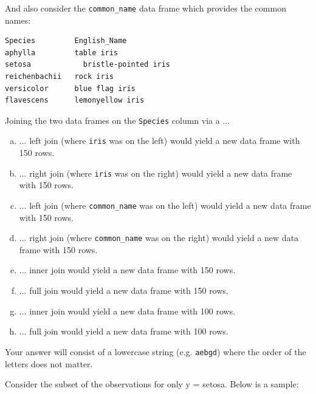 \documentclass[12pt,landscape]{article}
\newcommand{\instr}{\small Your answer will consist of a lowercase string (e.g. \texttt{aebgd}) where the order of the letters does not matter. \normalsize}
\begin{document}
\vspace{-0.7cm}

\noindent And also consider the \texttt{common\_name} data frame which provides the common names:

\lstset{
  basicstyle=\footnotesize,
  xleftmargin=.3\textwidth, xrightmargin=.3\textwidth
}
\begin{lstlisting}
Species         English_Name
aphylla	        table iris
setosa 		      bristle-pointed iris
reichenbachii   rock iris
versicolor      blue flag iris 
flavescens      lemonyellow iris
\end{lstlisting}
\vspace{-1cm}

\vspace{-0.2cm}\benum{} 

Joining the two data frames on the \texttt{Species} column via a ...
\begin{enumerate}[(a)]
\item ... left join (where \texttt{iris} was on the left) would yield a new data frame with 150 rows.
\item ... right join (where \texttt{iris} was on the right) would yield a new data frame with 150 rows.
\item ... left join (where \texttt{common\_name} was on the left) would yield a new data frame with 150 rows.
\item ... right join (where \texttt{common\_name} was on the right) would yield a new data frame with 150 rows.
\item ... inner join would yield a new data frame with 150 rows.
\item ... full join would yield a new data frame with 150 rows.
\item ... inner join would yield a new data frame with 100 rows.
\item ... full join would yield a new data frame with 100 rows.
\end{enumerate}
\eenum\instr\pagebreak


\problem{}  Consider the subset of the observations for only y = setosa. Below is a sample:
\end{document}
